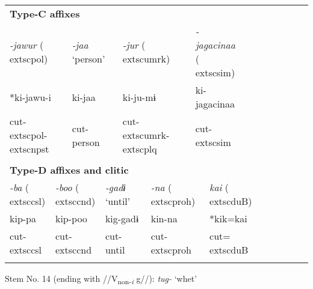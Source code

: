 \begin{tabularx}{\textwidth}{XXXXXXXXXXXXXXXXXXXXXX}
\multicolumn{22}{X}{{\bfseries Type-C affixes}}\\
\multicolumn{4}{X}{{ \textit{{}-jawur} (	extsc{pol})}} & \multicolumn{3}{X}{{ \textit{{}-jaa} ‘person’}} & \multicolumn{4}{X}{{ \textit{{}-jur} (	extsc{umrk})}} & \multicolumn{4}{X}{{ \textit{{}-jagacinaa} (	extsc{sim})}} & \multicolumn{7}{X}{}\\
\multicolumn{4}{X}{{ *ki-jawu-i}} & \multicolumn{3}{X}{ki-jaa} & \multicolumn{4}{X}{ki-ju-mɨ} & \multicolumn{4}{X}{{ ki-jagacinaa}} & \multicolumn{7}{X}{}\\
\multicolumn{4}{X}{cut-	extsc{pol}-	extsc{npst}} & \multicolumn{3}{X}{cut-person} & \multicolumn{4}{X}{cut-	extsc{umrk}-	extsc{plq}} & \multicolumn{4}{X}{cut-	extsc{sim}} & \multicolumn{7}{X}{}\\
\multicolumn{22}{X}{}\\
\multicolumn{22}{X}{{\bfseries Type-D affixes and clitic}}\\
\multicolumn{3}{X}{{ \textit{{}-ba} (	extsc{csl})}} & \multicolumn{3}{X}{{ \textit{{}-boo} (	extsc{cnd})}} & \multicolumn{2}{X}{{ \textit{{}-gadɨ} ‘until’}} & \multicolumn{4}{X}{{ \textit{{}-na} (	extsc{proh})}} & \multicolumn{5}{X}{{ \textit{kai} (	extsc{du}B)}} & \multicolumn{5}{X}{}\\
\multicolumn{3}{X}{{ kip-pa}} & \multicolumn{3}{X}{{ kip-poo}} & \multicolumn{2}{X}{{ kig-gadɨ}} & \multicolumn{4}{X}{{ kin-na}} & \multicolumn{5}{X}{{ *kik=kai}} & \multicolumn{5}{X}{}\\
\multicolumn{3}{X}{cut-	extsc{csl}} & \multicolumn{3}{X}{cut-	extsc{cnd}} & \multicolumn{2}{X}{cut-until} & \multicolumn{4}{X}{cut-	extsc{proh}} & \multicolumn{5}{X}{cut=	extsc{du}B} & \multicolumn{5}{X}{}\\
\lspbottomrule
\end{tabularx}
Stem No. 14 (ending with //V\textsubscript{non-}\textit{\textsubscript{i}} g//): \textit{tug-} ‘whet’

\tablefirsthead{}

